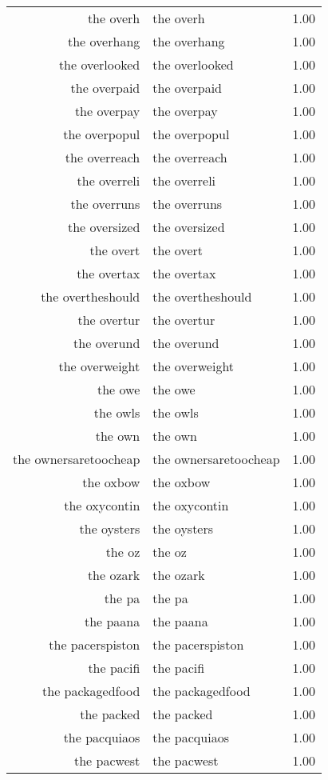 \begin{table}[ht]
\begin{tabular}{rlr}
  the overh & the overh & 1.00 \\ 
  the overhang & the overhang & 1.00 \\ 
  the overlooked & the overlooked & 1.00 \\ 
  the overpaid & the overpaid & 1.00 \\ 
  the overpay & the overpay & 1.00 \\ 
  the overpopul & the overpopul & 1.00 \\ 
  the overreach & the overreach & 1.00 \\ 
  the overreli & the overreli & 1.00 \\ 
  the overruns & the overruns & 1.00 \\ 
  the oversized & the oversized & 1.00 \\ 
  the overt & the overt & 1.00 \\ 
  the overtax & the overtax & 1.00 \\ 
  the overtheshould & the overtheshould & 1.00 \\ 
  the overtur & the overtur & 1.00 \\ 
  the overund & the overund & 1.00 \\ 
  the overweight & the overweight & 1.00 \\ 
  the owe & the owe & 1.00 \\ 
  the owls & the owls & 1.00 \\ 
  the own & the own & 1.00 \\ 
  the ownersaretoocheap & the ownersaretoocheap & 1.00 \\ 
  the oxbow & the oxbow & 1.00 \\ 
  the oxycontin & the oxycontin & 1.00 \\ 
  the oysters & the oysters & 1.00 \\ 
  the oz & the oz & 1.00 \\ 
  the ozark & the ozark & 1.00 \\ 
  the pa & the pa & 1.00 \\ 
  the paana & the paana & 1.00 \\ 
  the pacerspiston & the pacerspiston & 1.00 \\ 
  the pacifi & the pacifi & 1.00 \\ 
  the packagedfood & the packagedfood & 1.00 \\ 
  the packed & the packed & 1.00 \\ 
  the pacquiaos & the pacquiaos & 1.00 \\ 
  the pacwest & the pacwest & 1.00 \\ 

\end{tabular}
\end{table}
